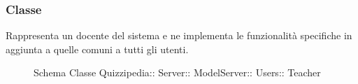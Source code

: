 \subsubsection{Classe }
Rappresenta un docente del sistema e ne implementa le funzionalità specifiche in aggiunta a quelle comuni a tutti gli utenti.
\begin{figure}[H]
\centering
\noindent{}
\caption[Schema Classe Teacher]{Schema Classe Quizzipedia:: Server:: ModelServer:: Users:: Teacher}
\end{figure}
